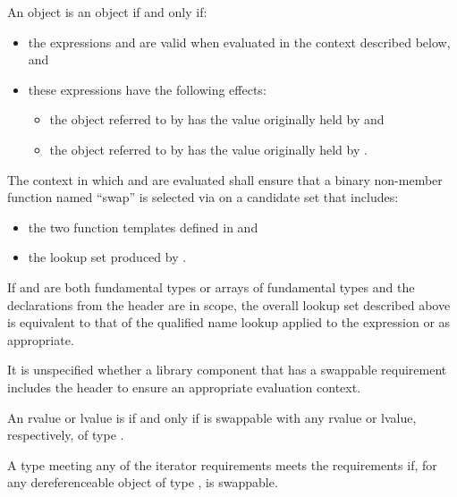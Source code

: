 \pnum
An object  is  an object  if and only if:
\begin{itemize}
\item the expressions  and  are valid when
evaluated in the context described below, and

\item these expressions have the following effects:
\begin{itemize}
\item the object referred to by  has the value originally held by  and
\item the object referred to by  has the value originally held by .
\end{itemize}
\end{itemize}

\pnum
The context in which  and  are evaluated shall
ensure that a binary non-member function named ``swap'' is selected via  on a candidate set that includes:
\begin{itemize}
\item the two  function templates defined in
 and

\item the lookup set produced by .
\end{itemize}
\begin{note}
If  and  are both fundamental types or arrays of
fundamental types and the declarations from the header  are in
scope, the overall lookup set described above is equivalent to that of the
qualified name lookup applied to the expression  or
 as appropriate.
\end{note}
\begin{note}
It is unspecified whether a library component that has a swappable
requirement includes the header  to ensure an appropriate
evaluation context.
\end{note}

\pnum
An rvalue or lvalue  is  if and only if  is
swappable with any rvalue or lvalue, respectively, of type .

\pnum
A type  meeting any of the iterator requirements
meets the  requirements if,
for any dereferenceable object
 of type ,
 is swappable.

